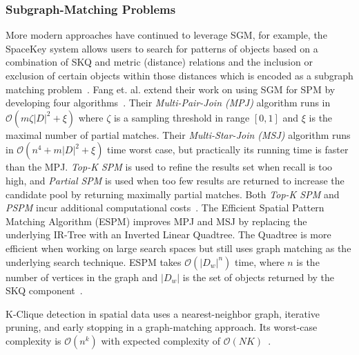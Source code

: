 \subsubsection{Subgraph-Matching Problems}
\par{
    More modern approaches have continued to leverage SGM, for example, the SpaceKey system allows users to search for patterns of objects based on a combination of SKQ and metric (distance) relations and the inclusion or exclusion of certain objects within those distances which is encoded as a subgraph matching problem~\cite{Fang2018}.
    Fang et. al. extend their work on using SGM for SPM by developing four algorithms~\cite{Fang2019}. 
    Their \textit{Multi-Pair-Join (MPJ)} algorithm runs in $\mathcal{O}(m\zeta |D|^2+\xi)$ where $\zeta$ is a sampling threshold in range $[0,1]$ and $\xi$ is the maximal number of partial matches. 
    Their \textit{Multi-Star-Join (MSJ)} algorithm runs in $\mathcal{O}(n^4+m|D|^2+\xi)$ time worst case, but practically its running time is faster than the MPJ. 
    \textit{Top-K SPM} is used to refine the results set when recall is too high, and \textit{Partial SPM} is used when too few results are returned to increase the candidate pool by returning maximally partial matches. 
    Both \textit{Top-K SPM} and \textit{PSPM} incur additional computational costs~\cite{Fang2019}.
    The Efficient Spatial Pattern Matching Algorithm (ESPM) improves MPJ and MSJ by replacing the underlying IR-Tree with an Inverted Linear Quadtree. 
    The Quadtree is more efficient when working on large search spaces but still uses graph matching as the underlying search technique. 
    ESPM takes $\mathcal{O}(|D_w|^n)$ time, where $n$ is the number of vertices in the graph and $|D_w|$ is the set of objects returned by the SKQ component~\cite{Chen2019}. 

    
    K-Clique detection in spatial data uses a nearest-neighbor graph, iterative pruning, and early stopping in a graph-matching approach. 
    Its worst-case complexity is $\mathcal{O}(n^k)$ with expected complexity of $\mathcal{O}(NK)$~\cite{Taniguchi2022}.
    }  

